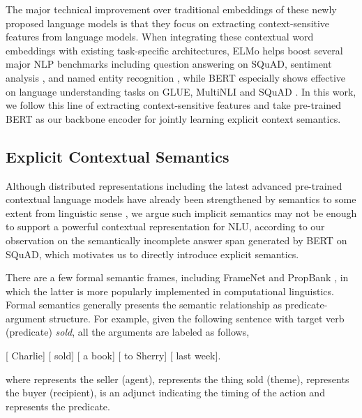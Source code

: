\documentclass[letterpaper]{article} \usepackage{aaai20}  \usepackage{times}  \usepackage{helvet} \usepackage{courier}  \usepackage[hyphens]{url}  \usepackage{graphicx} \urlstyle{rm} \def\UrlFont{\rm}  \usepackage{graphicx}  \frenchspacing  \usepackage{amssymb}
\begin{document}
The major technical improvement over traditional embeddings of these newly proposed language models is that they focus on extracting context-sensitive features from language models. When integrating these contextual word embeddings with existing task-specific architectures, ELMo helps boost several major NLP benchmarks \cite{Peters2018ELMO} including question answering on SQuAD, sentiment analysis \cite{socher2013recursive}, and named entity recognition \cite{sang2003introduction}, while BERT especially shows effective on language understanding tasks on GLUE, MultiNLI and SQuAD \cite{devlin2018bert}. In this work, we follow this line of extracting context-sensitive features and take pre-trained BERT as our backbone encoder for jointly learning explicit context semantics.

\subsection{Explicit Contextual Semantics}
Although distributed representations including the latest advanced pre-trained contextual language models have already been strengthened by semantics to some extent from linguistic sense \cite{clark2019does}, we argue such implicit semantics may not be enough to support a powerful contextual representation for NLU, according to our observation on the semantically incomplete answer span generated by BERT on SQuAD, which motivates us to directly introduce explicit semantics.

There are a few formal semantic frames, including FrameNet \cite{baker1998berkeley} and PropBank \cite{palmer2005proposition}, in which the latter is more popularly implemented in computational linguistics. Formal semantics generally presents the semantic relationship as predicate-argument structure. For example, given the following sentence with target verb (predicate) \emph{sold}, all the arguments are labeled as follows, 

[ Charlie] [ sold] [ a book] [ to Sherry] [ last week].

\noindent where  represents the  seller (agent),  represents the thing sold (theme),  represents the buyer (recipient),  is an adjunct indicating the timing of the action and  represents the predicate.
\end{document}
